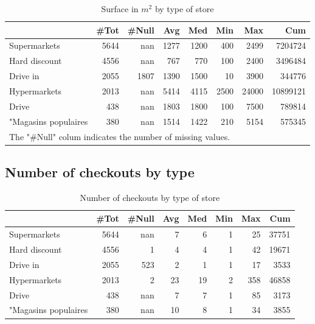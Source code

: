 \documentclass[11pt]{article}
\begin{document}
\begin{table}[H]
\caption{Surface in $m^2$ by type of store}
\small
\begin{tabular}{lrrrrrrr}
\toprule
{} &       \#Tot &      \#Null &        Avg &        Med &        Min &        Max &        Cum \\
\midrule
Supermarkets         &       5644 &        nan &       1277 &       1200 &        400 &       2499 &    7204724 \\
Hard discount        &       4556 &        nan &        767 &        770 &        100 &       2400 &    3496484 \\
Drive in             &       2055 &       1807 &       1390 &       1500 &         10 &       3900 &     344776 \\
Hypermarkets         &       2013 &        nan &       5414 &       4115 &       2500 &      24000 &   10899121 \\
Drive                &        438 &        nan &       1803 &       1800 &        100 &       7500 &     789814 \\
"Magasins populaires &        380 &        nan &       1514 &       1422 &        210 &       5154 &     575345 \\
\bottomrule
\multicolumn{8}{l}{The "\#Null" colum indicates the number of missing values.} \\
\end{tabular}
\end{table}

\subsection{Number of checkouts by type}

\begin{table}[H]
\caption{Number of checkouts by type of store}
\small
\begin{tabular}{lrrrrrrr}
\toprule
{} &       \#Tot &      \#Null &        Avg &        Med &        Min &        Max &        Cum \\
\midrule
Supermarkets         &       5644 &        nan &          7 &          6 &          1 &         25 &      37751 \\
Hard discount        &       4556 &          1 &          4 &          4 &          1 &         42 &      19671 \\
Drive in             &       2055 &        523 &          2 &          1 &          1 &         17 &       3533 \\
Hypermarkets         &       2013 &          2 &         23 &         19 &          2 &        358 &      46858 \\
Drive                &        438 &        nan &          7 &          7 &          1 &         85 &       3173 \\
"Magasins populaires &        380 &        nan &         10 &          8 &          1 &         34 &       3855 \\
\bottomrule
\end{tabular}
\end{table}
\end{document}
